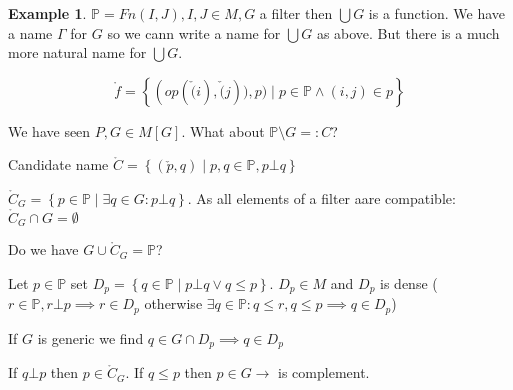 \documentclass{scrartcl}
\newcommand{\set}[1]{\left\{#1\right\}}
\theoremstyle{definition}
\newtheorem*{example*}{Example}
\theoremstyle{plain}
\theoremstyle{remark}
\begin{document}
	\begin{example*}
		$\mathbb{P} = Fn(I, J), I, J \in M, G$ a filter then $\bigcup G$ is a function.
		We have a name $\Gamma$ for $G$ so we cann write a name for $\bigcup G$ as above.
		But there is a much more natural name for $\bigcup G$.

		  $$ \mathring{f} = \set{(op(\check(i), \check(j)), p) \mid p \in \mathbb{P} \land 
		  (i, j) \in p} $$
	
		We have seen $P, G \in M[G]$. What about $\mathbb{P} \setminus G =: C$?

		Candidate name $\mathring{C} = \set{(\check{p}, q) \mid p, q \in \mathbb{P}, p \bot q}$

		$\mathring{C}_G = \set{p \in \mathbb{P} \mid \exists q \in G: p \bot q}$.
		As all elements of a filter aare compatible: $\mathring{C}_G \cap G = \emptyset$

		Do we have $G \cup \mathring{C}_G = \mathbb{P}$?
		
		Let $p \in \mathbb{P}$ set $D_p = \set{q \in \mathbb{P} \mid p \bot q \lor q \leq p }$.
		$D_p \in M$ and $D_p$ is dense ($r \in \mathbb{P}, r \bot p \implies r \in D_p$
		otherwise $\exists q \in \mathbb{P}: q \leq r, q \leq p \implies q \in D_p$)

		If $G$ is generic we find $q \in G \cap D_p \implies q \in D_p$

		If $q \bot p$ then $p \in \mathring{C}_G$. If $q \leq p$ then $p \in G \longrightarrow$ is complement.


		
	\end{example*}
\end{document}
